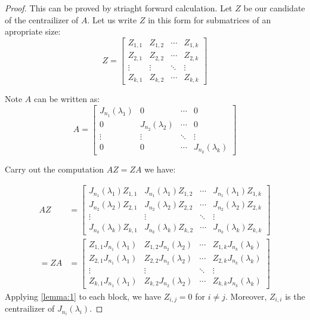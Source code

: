 \documentclass[12pt, a4paper]{article}
\theoremstyle{definition}
\theoremstyle{remark}
\begin{document}
\begin{proof}
	This can be proved by striaght forward calculation.
	Let $Z$ be our candidate of the centrailizer of $A$.
	Let us write $Z$ in this form for submatrices of an apropriate size:
	$$
		Z =
		\left[
			\begin{array}{cccc}
				Z_{1,1} & Z_{1,2} & \cdots & Z_{1,k} \\
				Z_{2,1} & Z_{2,2} & \cdots & Z_{2,k} \\
				\vdots  & \vdots  & \ddots & \vdots  \\
				Z_{k,1} & Z_{k,2} & \cdots & Z_{k,k}
			\end{array}
			\right]
	$$

	Note $A$ can be written as:
	\[
		A =
		\left[
			\begin{array}{cccc}
				J_{n_1}(\lambda_1) & 0                  & \cdots & 0                  \\
				0                  & J_{n_2}(\lambda_2) & \cdots & 0                  \\
				\vdots             & \vdots             & \ddots & \vdots             \\
				0                  & 0                  & \cdots & J_{n_k}(\lambda_k)
			\end{array}
			\right]
	\]

	Carry out the computation $AZ = ZA$ we have:

	\begin{align}
		AZ   & =
		\left[
			\begin{array}{cccc}
				J_{n_1}(\lambda_1)Z_{1,1} & J_{n_1}(\lambda_1)Z_{1,2} & \cdots & J_{n_1}(\lambda_1)Z_{1,k} \\
				J_{n_2}(\lambda_2)Z_{2,1} & J_{n_2}(\lambda_2)Z_{2,2} & \cdots & J_{n_2}(\lambda_2)Z_{2,k} \\
				\vdots                    & \vdots                    & \ddots & \vdots                    \\
				J_{n_k}(\lambda_k)Z_{k,1} & J_{n_k}(\lambda_k)Z_{k,2} & \cdots & J_{n_k}(\lambda_k)Z_{k,k}
			\end{array}
		\right]  \\
		= ZA & =
		\left[
			\begin{array}{cccc}
				Z_{1,1}J_{n_1}(\lambda_1) & Z_{1,2}J_{n_2}(\lambda_2) & \cdots & Z_{1,k}J_{n_k}(\lambda_k) \\
				Z_{2,1}J_{n_1}(\lambda_1) & Z_{2,2}J_{n_2}(\lambda_2) & \cdots & Z_{2,k}J_{n_k}(\lambda_k) \\
				\vdots                    & \vdots                    & \ddots & \vdots                    \\
				Z_{k,1}J_{n_1}(\lambda_1) & Z_{k,2}J_{n_2}(\lambda_2) & \cdots & Z_{k,k}J_{n_k}(\lambda_k)
			\end{array}
			\right]
	\end{align}
	Applying \ref{lemma:1} to each block, we have $Z_{i,j} = 0$ for $i \neq j$. Moreover, $Z_{i,i}$ is the centrailizer of $J_{n_i}(\lambda_i)$.
\end{proof}
\end{document}
